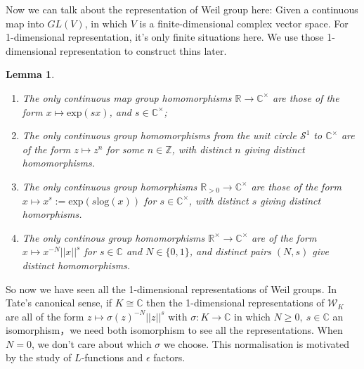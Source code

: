 \documentclass[12pt,a4paper,english]{article}
\theoremstyle{definition}
\theoremstyle{plain}
\newtheorem*{lem}{Lemma}
\begin{document}
Now we can talk about the representation of Weil group here:
Given a continuous map into $GL(V)$, in which $V$ is a finite-dimensional complex vector space.
For 1-dimensional representation, it's only finite situations here. We use those 1-dimensional representation to construct thins later.
\begin{lem}
\begin{enumerate}
    \item The only continuous map group homomorphisms $\mathbb{R}\rightarrow\mathbb{C}^{\times}$ are those of the form $x\mapsto \text{exp}(sx)$, and $s\in \mathbb{C}^{\times}$;
    \item The only continuous group homomorphisms from the unit circle $\mathcal{S}^{1}$ to $\mathbb{C}^{\times}$ are of the form $z\mapsto z^{n}$ for some $n\in\mathbb{Z}$, with distinct $n$ giving distinct homomorphisms.
    \item The only continuous group homorphisms $\mathbb{R}_{>0}\rightarrow \mathbb{C}^{\times}$ are those of the form $x\mapsto x^{s}:=\text{exp}(s\text{log}(x))$ for $s\in\mathbb{C}^{\times}$, with distinct $s$ giving distinct homorphisms.
    \item The only continous group homomorphisms $\mathbb{R}^{\times}\rightarrow \mathbb{C}^{\times}$ are of the form $x\mapsto x^{-N}||x||^{s}$ for $s\in\mathbb{C}$ and $N\in\{0,1\}$, and distinct pairs $(N,s)$ give distinct homomorphisms.
\end{enumerate}
\end{lem}

So now we have seen all the 1-dimensional representations of Weil groups. In Tate's canonical sense, if $K\cong\mathbb{C}$ then the 1-dimensional representations of $\mathcal{W}_{K}$ are all of the form $z\mapsto \sigma(z)^{-N}||z||^{s}$ with $\sigma: K\rightarrow\mathbb{C}$ in which $N\geq0,\ s\in\mathbb{C}$ an isomorphism，we need both isomorphism to see all the representations. When $N=0$, we don't care about which $\sigma$ we choose. This normalisation is motivated by the study of $L$-functions and $\epsilon$ factors.
\end{document}
